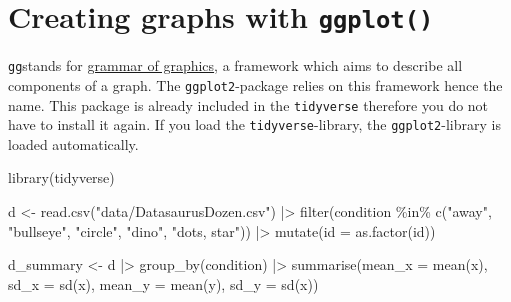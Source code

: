 \documentclass[
  letterpaper,
  DIV=11,
  numbers=noendperiod,
  oneside]{scrreprt}
\newenvironment{Shaded}{\begin{snugshade}}{\end{snugshade}}
\newcommand{\AttributeTok}[1]{\textcolor[rgb]{0.40,0.45,0.13}{#1}}
\newcommand{\FunctionTok}[1]{\textcolor[rgb]{0.28,0.35,0.67}{#1}}
\newcommand{\NormalTok}[1]{\textcolor[rgb]{0.00,0.23,0.31}{#1}}
\newcommand{\OtherTok}[1]{\textcolor[rgb]{0.00,0.23,0.31}{#1}}
\newcommand{\SpecialCharTok}[1]{\textcolor[rgb]{0.37,0.37,0.37}{#1}}
\newcommand{\StringTok}[1]{\textcolor[rgb]{0.13,0.47,0.30}{#1}}
\begin{document}
\hfill\break

\hypertarget{creating-graphs-with-ggplot}{%
\section{\texorpdfstring{Creating graphs with
\texttt{ggplot()}}{Creating graphs with ggplot()}}\label{creating-graphs-with-ggplot}}

\texttt{gg}stands for
\href{https://link.springer.com/book/10.1007/0-387-28695-0}{grammar of
graphics}, a framework which aims to describe all components of a graph.
The \texttt{ggplot2}-package relies on this framework hence the name.
This package is already included in the \texttt{tidyverse} therefore you
do not have to install it again. If you load the
\texttt{tidyverse}-library, the \texttt{ggplot2}-library is loaded
automatically.


\begin{Shaded}
\begin{Highlighting}[]
\FunctionTok{library}\NormalTok{(tidyverse)}

\NormalTok{d }\OtherTok{\textless{}{-}} \FunctionTok{read.csv}\NormalTok{(}\StringTok{"data/DatasaurusDozen.csv"}\NormalTok{) }\SpecialCharTok{|\textgreater{}}
    \FunctionTok{filter}\NormalTok{(condition }\SpecialCharTok{\%in\%} \FunctionTok{c}\NormalTok{(}\StringTok{"away"}\NormalTok{, }\StringTok{"bullseye"}\NormalTok{, }\StringTok{"circle"}\NormalTok{, }\StringTok{"dino"}\NormalTok{, }\StringTok{"dots, star"}\NormalTok{)) }\SpecialCharTok{|\textgreater{}}
    \FunctionTok{mutate}\NormalTok{(}\AttributeTok{id =} \FunctionTok{as.factor}\NormalTok{(id))}

\NormalTok{d\_summary }\OtherTok{\textless{}{-}}\NormalTok{ d }\SpecialCharTok{|\textgreater{}} \FunctionTok{group\_by}\NormalTok{(condition) }\SpecialCharTok{|\textgreater{}}
    \FunctionTok{summarise}\NormalTok{(}\AttributeTok{mean\_x =} \FunctionTok{mean}\NormalTok{(x),}
              \AttributeTok{sd\_x =} \FunctionTok{sd}\NormalTok{(x),}
              \AttributeTok{mean\_y =} \FunctionTok{mean}\NormalTok{(y),}
              \AttributeTok{sd\_y =} \FunctionTok{sd}\NormalTok{(x))}
\end{Highlighting}
\end{Shaded}
\end{document}
